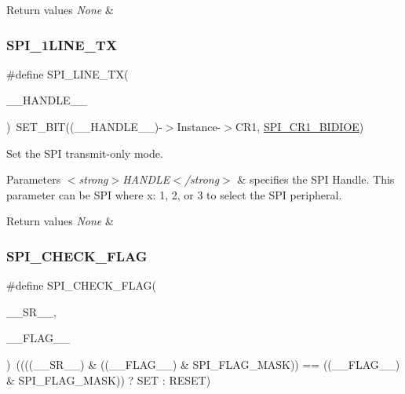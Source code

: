 \begin{DoxyRetVals}{Return values}
{\em None} & \\
\hline
\end{DoxyRetVals}
\mbox{\label{group___s_p_i___private___macros_gae3b2eb5e818e58b66474d42dedac5523}} 
\subsubsection{\texorpdfstring{SPI\_1LINE\_TX}{SPI\_1LINE\_TX}}
{\footnotesize\ttfamily \#define S\+P\+I\+\_\+L\+I\+N\+E\+\_\+\+TX(\begin{DoxyParamCaption}\item[{}]{\+\_\+\+\_\+\+H\+A\+N\+D\+L\+E\+\_\+\+\_\+ }\end{DoxyParamCaption})~S\+E\+T\+\_\+\+B\+IT((\+\_\+\+\_\+\+H\+A\+N\+D\+L\+E\+\_\+\+\_\+)-\/$>$Instance-\/$>$C\+R1, \mbox{\hyperlink{group___peripheral___registers___bits___definition_ga378953916b7701bd49f063c0366b703f}{S\+P\+I\+\_\+\+C\+R1\+\_\+\+B\+I\+D\+I\+OE}})}



Set the S\+PI transmit-\/only mode. 


\begin{DoxyParams}{Parameters}
{\em $<$strong$>$\+H\+A\+N\+D\+L\+E$<$/strong$>$} & specifies the S\+PI Handle. This parameter can be S\+PI where x\+: 1, 2, or 3 to select the S\+PI peripheral. \\
\hline
\end{DoxyParams}

\begin{DoxyRetVals}{Return values}
{\em None} & \\
\hline
\end{DoxyRetVals}
\mbox{\label{group___s_p_i___private___macros_gae9c6be610681f2142fb012de95e6e59d}} 
\subsubsection{\texorpdfstring{SPI\_CHECK\_FLAG}{SPI\_CHECK\_FLAG}}
{\footnotesize\ttfamily \#define S\+P\+I\+\_\+\+C\+H\+E\+C\+K\+\_\+\+F\+L\+AG(\begin{DoxyParamCaption}\item[{}]{\+\_\+\+\_\+\+S\+R\+\_\+\+\_\+,  }\item[{}]{\+\_\+\+\_\+\+F\+L\+A\+G\+\_\+\+\_\+ }\end{DoxyParamCaption})~((((\+\_\+\+\_\+\+S\+R\+\_\+\+\_\+) \& ((\+\_\+\+\_\+\+F\+L\+A\+G\+\_\+\+\_\+) \& S\+P\+I\+\_\+\+F\+L\+A\+G\+\_\+\+M\+A\+SK)) == ((\+\_\+\+\_\+\+F\+L\+A\+G\+\_\+\+\_\+) \& S\+P\+I\+\_\+\+F\+L\+A\+G\+\_\+\+M\+A\+SK)) ? S\+ET \+: R\+E\+S\+ET)}



